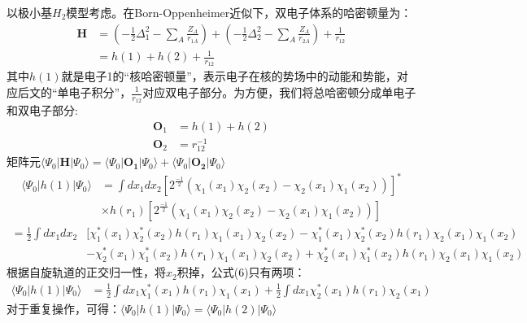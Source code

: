 \documentclass[12pt, a4paper, oneside]{ctexart}
\begin{document}
以极小基$H_2$模型考虑。在Born-Oppenheimer近似下，双电子体系的哈密顿量为：
\begin{equation}
\begin{aligned}
	\mathbf{H}&= \left(-\frac12\Delta_1^2-\sum_A\frac{Z_A}{r_{1A}}\right)+\left(-\frac12\Delta_2^2-\sum_A\frac{Z_A}{r_{2A}}\right)+\frac{1}{r_{12}}\\
			  &=h(1)+h(2)+\frac{1}{r_{12}}
\end{aligned}
\end{equation}
其中$h(1)$就是电子1的“核哈密顿量”，表示电子在核的势场中的动能和势能，对应后文的“单电子积分”，$\frac{1}{r_{12}}$对应双电子部分。为方便，我们将总哈密顿分成单电子和双电子部分:
\begin{equation}
\begin{aligned}
	\mathbf{O}_1&=h(1)+h(2)\\
	\mathbf{O}_2&=r_{12}^{-1}
\end{aligned}
\end{equation}
矩阵元$\langle\Psi_0|\mathbf{H}|\Psi_0\rangle=\langle\Psi_0|\mathbf{O_1}|\Psi_0\rangle+\langle\Psi_0|\mathbf{O_2}|\Psi_0\rangle$
\begin{equation}
\begin{aligned}
\langle\Psi_0|h(1)|\Psi_0\rangle&=\int dx_1dx_2[2^{\frac{-1}{2}}(\chi_1(x_1)\chi_2(x_2)-\chi_2(x_1)\chi_1(x_2))]^*\\
								&\times h(r_1)[2^{\frac{-1}{2}}(\chi_1(x_1)\chi_2(x_2)-\chi_2(x_1)\chi_1(x_2))]
\end{aligned}
\end{equation}
\begin{equation}
\begin{aligned}
=\frac12\int dx_1dx_2&[\chi_1^*(x_1)\chi_2^*(x_2)h(r_1)\chi_1(x_1)\chi_2(x_2)-\chi_1^*(x_1)\chi_2^*(x_2)h(r_1)\chi_2(x_1)\chi_1(x_2)\\
&-\chi_2^*(x_1)\chi_1^*(x_2)h(r_1)\chi_1(x_1)\chi_2(x_2)+\chi_2^*(x_1)\chi_1^*(x_2)h(r_1)\chi_2(x_1)\chi_1(x_2)
\end{aligned}
\end{equation}
根据自旋轨道的正交归一性，将$x_2$积掉，公式(6)只有两项：
\begin{equation}
\begin{aligned}
\langle\Psi_0|h(1)|\Psi_0\rangle&=\frac12\int dx_1\chi_1^*(x_1)h(r_1)\chi_1(x_1)+\frac12\int dx_1\chi_2^*(x_1)h(r_1)\chi_2(x_1)
\end{aligned}
\end{equation}
对于重复操作，可得：$\langle\Psi_0|h(1)|\Psi_0\rangle=\langle\Psi_0|h(2)|\Psi_0\rangle$
\end{document}
